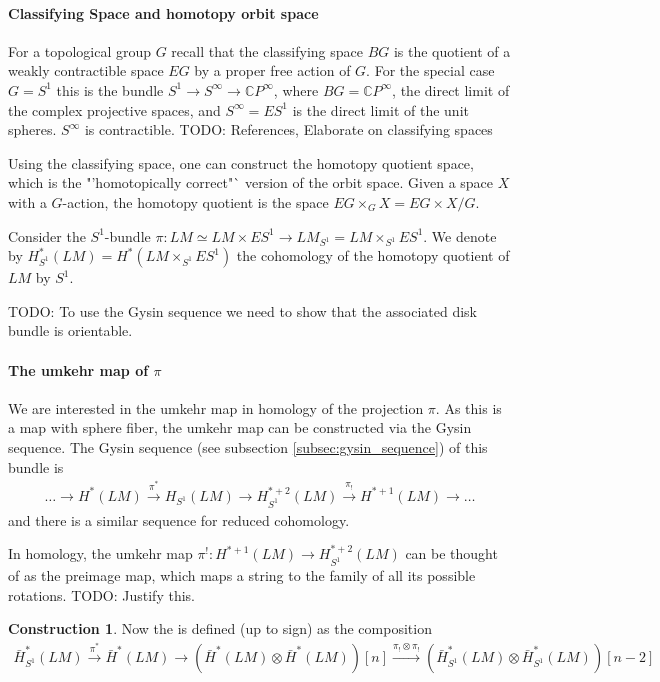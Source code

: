 \documentclass{scrartcl}
\let\emph\relax
\newcommand{\emphi}[1]{\index{#1}\emph{#1}}
\theoremstyle{plain}
\theoremstyle{definition}
\newtheorem{construction}[theorem]{Construction}
\newcommand{\C}{\mathbb C}
\let\xto\xrightarrow
\begin{document}
\paragraph{Classifying Space and homotopy orbit space} For a topological group $G$ recall that the classifying space $BG$ is the quotient of a weakly contractible space $EG$ by a proper free action of $G$. For the special case $G=S^1$ this is the bundle $S^1\to S^\infty\to \C P^\infty$, where $BG = \C P^\infty$, the direct limit of the complex projective spaces, and $S^\infty = ES^1$ is the direct limit of the unit spheres. $S^\infty$ is contractible. TODO: References, Elaborate on classifying spaces

Using the classifying space, one can construct the homotopy quotient space, which is the "'homotopically correct"` version of the orbit space. Given a space $X$ with a $G$-action, the homotopy quotient is the space $EG\times_G X = EG\times X / G$. 

Consider the $S^1$-bundle $\pi\colon LM\simeq LM\times ES^1\to LM_{S^1} = LM\times_{S^1} ES^1$. We denote by $H^*_{S^1}(LM) = H^*(LM\times_{S^1} ES^1)$ the cohomology of the homotopy quotient of $LM$ by $S^1$. 

TODO: To use the Gysin sequence we need to show that the associated disk bundle is orientable.

\paragraph{The umkehr map of $\pi$} We are interested in the umkehr map in homology of the projection $\pi$. As this is a map with sphere fiber, the umkehr map can be constructed via the Gysin sequence. The Gysin sequence (see subsection \ref{subsec:gysin_sequence}) of this bundle is 
\begin{align*}
    \dots \to H^*(LM)\xrightarrow{\pi^*} H_{S^1}(LM) \to H^{*+2}_{S^1}(LM) \xrightarrow{\pi_!} H^{*+1}(LM) \to \dots
\end{align*}
and there is a similar sequence for reduced cohomology. 

In homology, the umkehr map $\pi^!\colon H^{*+1}(LM)\to H^{*+2}_{S^1}(LM)$ can be thought of as the preimage map, which maps a string to the family of all its possible rotations. TODO: Justify this.

\begin{construction}
    Now the \emphi{string bracket} is defined (up to sign) as the composition
\begin{align*}
    \bar H_{S^1}^*(LM) \xto{\pi^*} \bar H^*(LM)\to (\bar H^*(LM) \otimes \bar H^*(LM))[n] \xto{\pi_!\otimes\pi_!} (\bar H^*_{S^1}(LM)\otimes\bar H^*_{S^1}(LM))[n-2]
\end{align*}
\end{construction}
\end{document}
